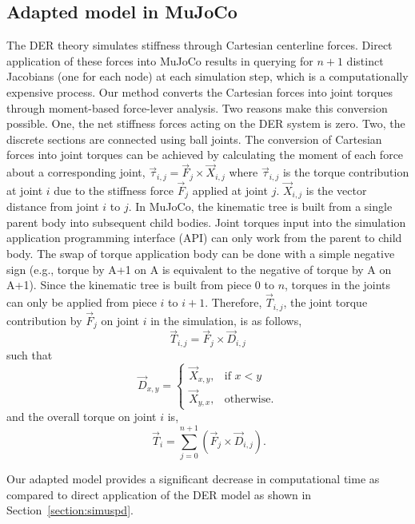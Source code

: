\documentclass[letterpaper, 10 pt, conference]{ieeeconf}  %
\begin{document}
\subsection{Adapted model in MuJoCo}
\label{section:adaptmod}
The DER theory simulates stiffness through Cartesian centerline forces. Direct application of these forces into MuJoCo results in querying for $n+1$ distinct Jacobians (one for each node) at each simulation step, which is a computationally expensive process. Our method converts the Cartesian forces into joint torques through moment-based force-lever analysis. Two reasons make this conversion possible. One, the net stiffness forces acting on the DER system is zero. Two, the discrete sections are connected using ball joints. The conversion of Cartesian forces into joint torques can be achieved by calculating the moment of each force about a corresponding joint, $\vec{\tau}_{i,j} = \vec{F}_{j} \times \vec{X}_{i,j}$ where $\vec{\tau}_{i,j}$ is the torque contribution at joint $i$ due to the stiffness force $\vec{F}_{j}$ applied at joint $j$. $\vec{X}_{i,j}$ is the vector distance from joint $i$ to $j$. In MuJoCo, the kinematic tree is built from a single parent body into subsequent child bodies. Joint torques input into the simulation application programming interface (API) can only work from the parent to child body. The swap of torque application body can be done with a simple negative sign (e.g., torque by A+1 on A is equivalent to the negative of torque by A on A+1). Since the kinematic tree is built from piece $0$ to $n$, torques in the joints can only be applied from piece $i$ to $i+1$. Therefore, $\vec{T}_{i,j}$, the joint torque contribution by $\vec{F}_{j}$ on joint $i$ in the simulation, is as follows,
\begin{equation}
	\label{eq:f2t_api}
	\vec{T}_{i,j} = \vec{F}_{j} \times \vec{D}_{i,j}
\end{equation}
such that 
\[
\vec{D}_{x,y} = 
\begin{cases}
	\vec{X}_{x,y},& \text{if } x < y\\
	\vec{X}_{y,x},              & \text{otherwise}.
\end{cases}
\]
and the overall torque on joint $i$ is,
\begin{equation}
	\label{eq:f2t_sum}
	\ \vec{T}_{i} = \sum_{j=0}^{n+1} (\vec{F}_{j} \times \vec{D}_{i,j}).
\end{equation}

Our adapted model provides a significant decrease in computational time as compared to direct application of the DER model as shown in Section~\ref{section:simuspd}.
\end{document}
